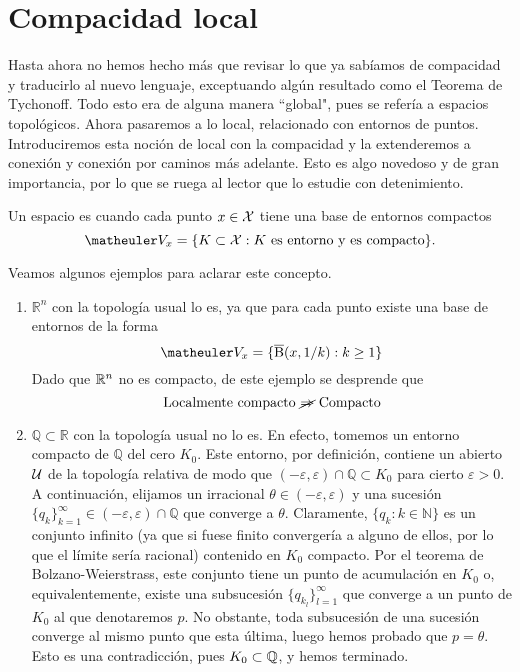 \section{Compacidad local}

Hasta ahora no hemos hecho más que revisar lo que ya sabíamos de compacidad y traducirlo al nuevo lenguaje, exceptuando algún resultado como el Teorema de Tychonoff. Todo esto era de alguna manera ``global", pues se refería  a espacios topológicos. Ahora pasaremos a lo local, relacionado con entornos de puntos. Introduciremos esta noción de local con la compacidad y la extenderemos a conexión y conexión por caminos más adelante. Esto es algo novedoso y de gran importancia, por lo que se ruega al lector que lo estudie con detenimiento.

\begin{defi} Un espacio es  cuando cada punto $x\in\mathcal{X}$ tiene una base de entornos compactos
	\[\Va{x}=\{K\subset \X: K\text{ es entorno y es compacto}\}.\]
\end{defi}

Veamos algunos ejemplos para aclarar este concepto. 

\begin{exa}
	\begin{enumerate}
		\item $\mathbb{R}^n$ con la topología usual lo es, ya que para cada punto existe una base de entornos de la forma
		\[\Va{x}=\{\adher{\bola}(x,1/k):k\geq 1\}\]
		Dado que $\mathbb{R}^n$ no es compacto, de este ejemplo se desprende que
		\[\text{Localmente compacto }\cancel{\Rightarrow} \text{ Compacto}\]
		
		\item $\mathbb{Q}\subset \mathbb{R}$ con la topología usual no lo es. En efecto, tomemos un entorno compacto de $\mathbb{Q}$ del cero $K_0$. Este entorno, por definición, contiene un abierto $\mathcal{U}$ de la topología relativa de modo que $(-\varepsilon,\varepsilon)\cap \mathbb{Q}\subset K_0$ para cierto $\varepsilon>0$. A continuación, elijamos un irracional $\theta \in (-\varepsilon,\varepsilon)$ y una sucesión $\{q_k\}_{k=1}^\infty\in (-\varepsilon,\varepsilon)\cap \mathbb{Q}$ que converge a $\theta$. Claramente, $\{q_k:k\in \mathbb{N}\}$ es un conjunto infinito (ya que si fuese finito convergería a alguno de ellos, por lo que el límite sería racional) contenido en $K_0$ compacto. Por el teorema de Bolzano-Weierstrass, este conjunto tiene un punto de acumulación en $K_0$ o, equivalentemente, existe una subsucesión $\{q_{k_l}\}_{l=1}^\infty$ que converge a un punto de $K_0$ al que denotaremos $p$. No obstante, toda subsucesión de una sucesión converge al mismo punto que esta última, luego hemos probado que $p=\theta$. Esto es una contradicción, pues $K_0\subset \mathbb{Q}$, y hemos terminado. 
	\end{enumerate}
\end{exa}

